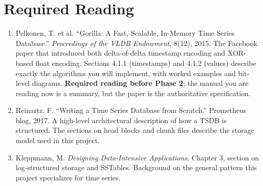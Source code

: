 \documentclass[11pt,a4paper]{article}
\begin{document}
\section{Required Reading}

\begin{enumerate}
\item Pelkonen, T. et al. ``Gorilla: A Fast, Scalable, In-Memory Time Series Database.'' \textit{Proceedings of the VLDB Endowment}, 8(12), 2015. The Facebook paper that introduced both delta-of-delta timestamp encoding and XOR-based float encoding. Sections 4.1.1 (timestamps) and 4.1.2 (values) describe exactly the algorithms you will implement, with worked examples and bit-level diagrams. \textbf{Required reading before Phase 2}; the manual you are reading now is a summary, but the paper is the authoritative specification.
\item Reinartz, F. ``Writing a Time Series Database from Scratch.'' Prometheus blog, 2017. A high-level architectural description of how a TSDB is structured. The sections on head blocks and chunk files describe the storage model used in this project.
\item Kleppmann, M. \textit{Designing Data-Intensive Applications}, Chapter 3, section on log-structured storage and SSTables. Background on the general pattern this project specializes for time series.
\end{enumerate}

\footerboxes
\end{document}
